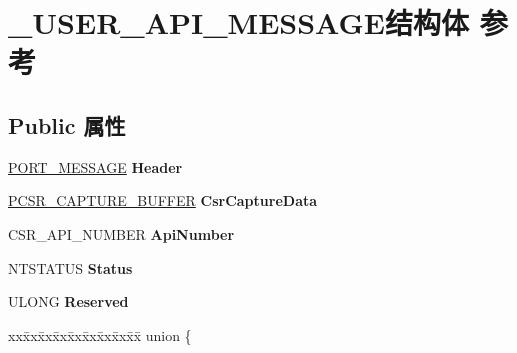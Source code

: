 \hypertarget{struct___u_s_e_r___a_p_i___m_e_s_s_a_g_e}{}\section{\+\_\+\+U\+S\+E\+R\+\_\+\+A\+P\+I\+\_\+\+M\+E\+S\+S\+A\+G\+E结构体 参考}
\label{struct___u_s_e_r___a_p_i___m_e_s_s_a_g_e}
\subsection*{Public 属性}
\begin{DoxyCompactItemize}
\item 
\mbox{\label{struct___u_s_e_r___a_p_i___m_e_s_s_a_g_e_a5ed6343b0331952e305e68abd82c339d}} 
\hyperlink{struct___p_o_r_t___m_e_s_s_a_g_e___h_e_a_d_e_r}{P\+O\+R\+T\+\_\+\+M\+E\+S\+S\+A\+GE} {\bfseries Header}
\item 
\mbox{\label{struct___u_s_e_r___a_p_i___m_e_s_s_a_g_e_a717802208914402bdf3b1c03a163b4fb}} 
\hyperlink{struct___c_s_r___c_a_p_t_u_r_e___b_u_f_f_e_r}{P\+C\+S\+R\+\_\+\+C\+A\+P\+T\+U\+R\+E\+\_\+\+B\+U\+F\+F\+ER} {\bfseries Csr\+Capture\+Data}
\item 
\mbox{\label{struct___u_s_e_r___a_p_i___m_e_s_s_a_g_e_ad55ef136d69519de455033c9b437e649}} 
C\+S\+R\+\_\+\+A\+P\+I\+\_\+\+N\+U\+M\+B\+ER {\bfseries Api\+Number}
\item 
\mbox{\label{struct___u_s_e_r___a_p_i___m_e_s_s_a_g_e_a850ff1a45c84b950c888a1c9938419d1}} 
N\+T\+S\+T\+A\+T\+US {\bfseries Status}
\item 
\mbox{\label{struct___u_s_e_r___a_p_i___m_e_s_s_a_g_e_a414d7e70adf189ec8018fb936b3f460b}} 
U\+L\+O\+NG {\bfseries Reserved}
\item 
\mbox{\label{struct___u_s_e_r___a_p_i___m_e_s_s_a_g_e_a9ec16c22a8bf0edde5bd148697347193}} 
\begin{tabbing}
xx\=xx\=xx\=xx\=xx\=xx\=xx\=xx\=xx\=\kill
union \{\\

\end{tabbing}
\end{DoxyCompactItemize}
